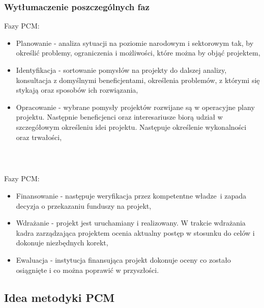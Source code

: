 \documentclass{beamer}
\begin{document}
\begin{frame}\frametitle{Wytłumaczenie poszczególnych faz}
	\begin{exampleblock}{Fazy PCM:}
		\begin{itemize}
		    \item Planowanie - analiza sytuacji na poziomie narodowym i sektorowym tak, by określić problemy, ograniczenia i możliwości, które można by objąć projektem,
            \item Identyfikacja - sortowanie pomysłów na projekty do dalszej analizy, konsultacja z domyślnymi beneficjentami, określenia problemów, z którymi się stykają oraz sposobów ich rozwiązania,
            \item Opracowanie - wybrane pomysły projektów rozwijane są w operacyjne plany projektu. Następnie beneficjenci oraz interesariusze biorą udział w szczegółowym określeniu idei projektu. Następuje określenie wykonalności oraz trwałości,
	    \end{itemize}
	\end{exampleblock}
\end{frame}

\begin{frame}\frametitle{ }
	\begin{exampleblock}{Fazy PCM:}
		\begin{itemize}
		    \item Finansowanie - następuje weryfikacja przez kompetentne władze i zapada decyzja o przekazaniu funduszy na projekt,
		    \item Wdrażanie - projekt jest uruchamiany i realizowany. W trakcie wdrażania kadra zarządzająca projektem ocenia aktualny postęp w stosunku do celów i dokonuje niezbędnych korekt,
		    \item Ewaluacja - instytucja finansująca projekt dokonuje oceny co zostało osiągnięte i co można poprawić w przyszłości.
		\end{itemize}
	\end{exampleblock}
\end{frame}

\subsection{Idea metodyki PCM}
\end{document}
